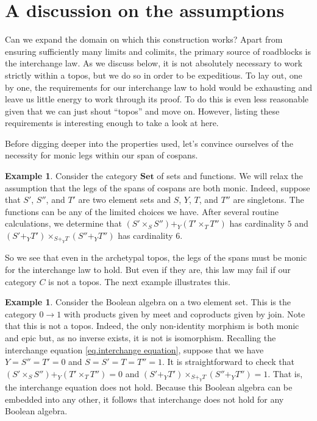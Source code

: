 \documentclass[11pt]{amsart}
\newcommand{\cat}[1]{\mathbf{#1}}
\theoremstyle{remark}
\theoremstyle{definition}
\newtheorem{ex}[thm]{Example}
\begin{document}
\section{A discussion on the assumptions}  %
\label{sec.Disc on Assump}
%

Can we expand the domain on which this construction works? Apart from ensuring sufficiently many limits and colimits, the primary source of roadblocks is the interchange law. As we discuss below, it is not absolutely necessary to work strictly within a topos, but we do so in order to be expeditious.  To lay out, one by one, the requirements for our interchange law to hold would be exhausting and leave us little energy to work through its proof. To do this is even less reasonable given that we can just shout ``topos'' and move on.   However, listing these requirements is interesting enough to take a look at here.  
%
%
%
%
%

Before digging deeper into the properties used, let's convince ourselves of the necessity for monic legs within our span of cospans.

\begin{ex}
	Consider the category $\cat{Set}$ of sets and functions. We will relax the assumption that the legs of the spans of cospans are both monic.  Indeed, suppose that $S'$, $S''$, and $T'$ are two element sets and $S$, $Y$, $T$, and $T''$ are singletons.  The functions can be any of the limited choices we have.  After several routine calculations, we determine that $(S' \times_S S'') +_Y (T' \times_T T'')$ has cardinality $5$ and $(S' +_Y T') \times_{S+_YT} (S''+_YT'')$ has cardinality $6$. 
\end{ex}

So we see that even in the archetypal topos, the legs of the spans must be monic for the interchange law to hold. But even if they are, this law may fail if our category $C$ is not a topos. The next example illustrates this.

\begin{ex}
	Consider the Boolean algebra on a two element set.  This is the category $0 \to 1$ with products given by meet and coproducts given by join. Note that this is not a topos. Indeed, the only non-identity morphism is both monic and epic but, as no inverse exists, it is not is isomorphism. Recalling the interchange equation \eqref{eq.interchange equation}, suppose that we have $Y=S''=T'=0$ and $S=S'=T=T''=1$.  It is straightforward to check that $(S' \times_S S'') +_Y (T' \times_T T'') = 0$ and $(S' +_Y T') \times_{S+_YT} (S''+_YT'')=1$. That is, the interchange equation does not hold.  Because this Boolean algebra can be embedded into any other, it follows that interchange does not hold for any Boolean algebra.
\end{ex}
\end{document}
